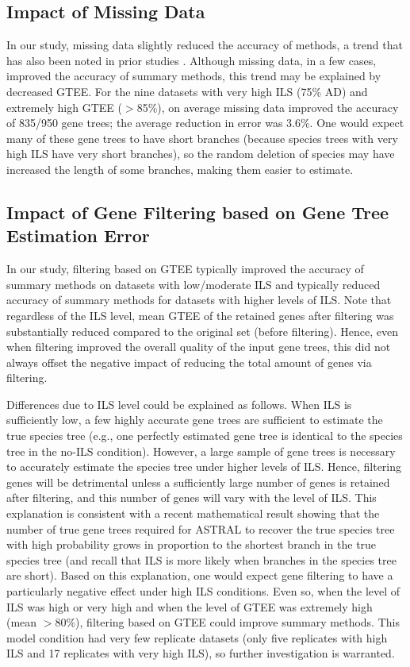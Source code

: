 \subsection{Impact of Missing Data}
In our study, missing data slightly reduced the accuracy of methods, a trend that has also been noted in prior studies \cite{hovmoller2013effects,vachaspati2015astrid,xi2016impact}.
Although missing data, in a few cases, improved the accuracy of summary methods, this trend may be explained by decreased GTEE.
For the nine datasets with very high ILS (75\% AD) and extremely high GTEE ($>$85\%), on average missing data improved the accuracy of 835/950 gene trees; the average reduction in error was 3.6\%. 
One would expect many of these gene trees to have short branches (because species trees with very high ILS have very short branches), so the random deletion of species may have increased the length of some branches, making them easier to estimate.

\subsection{Impact of Gene Filtering based on Gene Tree Estimation Error}
In our study, filtering based on GTEE typically improved the accuracy of summary methods on datasets with low/moderate ILS and typically reduced accuracy of summary methods for datasets with higher levels of ILS. 
Note that regardless of the ILS level, mean GTEE of the retained genes after filtering was substantially reduced compared to the original set (before filtering).
Hence, even when filtering improved the overall quality of the input gene trees, this did not always offset the negative impact of reducing the total amount of genes via filtering.

Differences due to ILS level could be explained as follows. 
When ILS is sufficiently low, a few highly accurate gene trees are sufficient to estimate the true species tree (e.g., one perfectly estimated gene tree is identical to the species tree in the no-ILS condition). 
However, a large sample of gene trees is necessary to accurately estimate the species tree under higher levels of ILS. Hence, filtering genes will be detrimental unless a sufficiently large number of genes is retained after filtering, and this number of genes will vary with the level of ILS. 
This explanation is consistent with a recent mathematical result showing that the number of true gene trees required for ASTRAL to recover the true species tree with high probability grows in proportion to the shortest branch in the true species tree \cite{shekhar2018species} (and recall that ILS is more likely when branches in the species tree are short). 
Based on this explanation, one would expect gene filtering to have a particularly negative effect under high ILS conditions. 
Even so, when the level of ILS was high or very high and when the level of GTEE was extremely high (mean $>80\%$), filtering based on GTEE could improve summary methods.
This model condition had very few replicate datasets (only five replicates with high ILS and 17 replicates with very high ILS), so further investigation is warranted.


